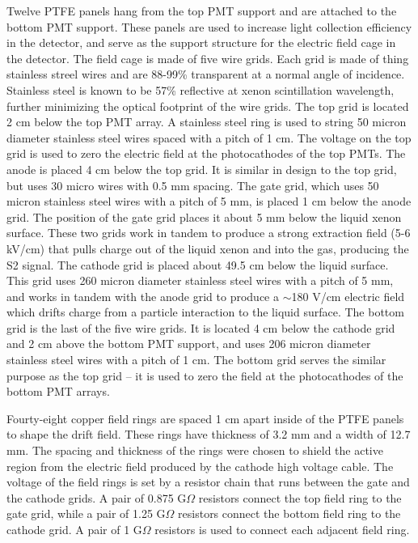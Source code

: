 \documentclass[a4paper,12pt]{article}
\begin{document}
Twelve PTFE panels hang from the top PMT support and are attached to the bottom PMT support.  These panels are used to increase light collection efficiency in the detector, and serve as the support structure for the electric field cage in the detector.  The field cage is made of five wire grids.  Each grid is made of thing stainless streel wires and are 88-99\% transparent at a normal angle of incidence.  Stainless steel is known to be 57\% reflective at xenon scintillation wavelength, further minimizing the optical footprint of the wire grids. The top grid is located 2 cm below the top PMT array.  A stainless steel ring is used to string 50 micron diameter stainless steel wires spaced with a pitch of 1 cm.  The voltage on the top grid is used to zero the electric field at the photocathodes of the top PMTs.  The anode is placed 4 cm below the top grid.  It is similar in design to the top grid, but uses 30 micro wires with 0.5 mm spacing. The gate grid, which uses 50 micron stainless steel wires with a pitch of 5 mm, is placed 1 cm below the anode grid. The position of the gate grid places it about 5 mm below the liquid xenon surface.   These two grids work in tandem to produce a strong extraction field (5-6 kV/cm) that pulls charge out of the liquid xenon and into the gas, producing the S2 signal. The cathode grid is placed about 49.5 cm below the liquid surface. This grid uses 260 micron diameter stainless steel wires with a pitch of 5 mm, and works in tandem with the anode grid to produce a $\sim$180 V/cm electric field which drifts charge from a particle interaction to the liquid surface.  The bottom grid is the last of the five wire grids.  It is located 4 cm below the cathode grid and 2 cm above the bottom PMT support, and uses 206 micron diameter stainless steel wires with a pitch of 1 cm.  The bottom grid serves the similar purpose as the top grid – it is used to zero the field at the photocathodes of the bottom PMT arrays.

Fourty-eight copper field rings are spaced 1 cm apart inside of the PTFE panels to shape the drift field. These rings have thickness of 3.2 mm and a width of 12.7 mm.  The spacing and thickness of the rings were chosen to shield the active region from the electric field produced by the cathode high voltage cable.  The voltage of the field rings is set by a resistor chain that runs between the gate and the cathode grids.  A pair of  0.875 G$\Omega$ resistors connect the top field ring to the gate grid, while a pair of 1.25 G$\Omega$ resistors connect the bottom field ring to the cathode grid.  A pair of 1 G$\Omega$ resistors is used to connect each adjacent field ring.
\end{document}
